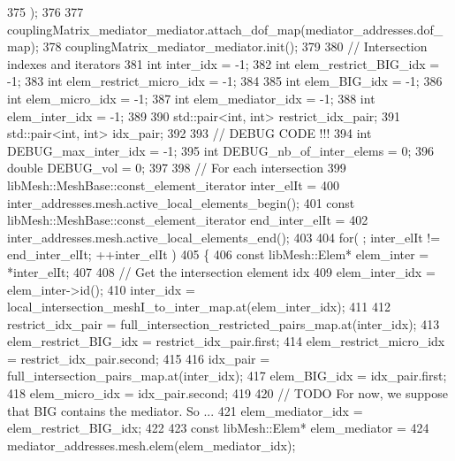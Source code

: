 \begin{DoxyCode}
375                 );
376         
377         couplingMatrix\_mediator\_mediator.attach\_dof\_map(mediator\_addresses.dof\_map);
378         couplingMatrix\_mediator\_mediator.init();
379 
380         \textcolor{comment}{// Intersection indexes and iterators}
381         \textcolor{keywordtype}{int} inter\_idx = -1;
382         \textcolor{keywordtype}{int} elem\_restrict\_BIG\_idx = -1;
383         \textcolor{keywordtype}{int} elem\_restrict\_micro\_idx = -1;
384 
385         \textcolor{keywordtype}{int} elem\_BIG\_idx = -1;
386         \textcolor{keywordtype}{int} elem\_micro\_idx = -1;
387         \textcolor{keywordtype}{int} elem\_mediator\_idx = -1;
388         \textcolor{keywordtype}{int} elem\_inter\_idx = -1;
389 
390         std::pair<int, int> restrict\_idx\_pair;
391         std::pair<int, int> idx\_pair;
392 
393         \textcolor{comment}{// DEBUG CODE !!!}
394         \textcolor{keywordtype}{int} DEBUG\_max\_inter\_idx = -1;
395         \textcolor{keywordtype}{int} DEBUG\_nb\_of\_inter\_elems = 0;
396         \textcolor{keywordtype}{double} DEBUG\_vol = 0;
397 
398         \textcolor{comment}{// For each intersection}
399         libMesh::MeshBase::const\_element\_iterator           inter\_elIt =
400                 inter\_addresses.mesh.active\_local\_elements\_begin();
401         \textcolor{keyword}{const} libMesh::MeshBase::const\_element\_iterator     end\_inter\_elIt =
402                 inter\_addresses.mesh.active\_local\_elements\_end();
403 
404         \textcolor{keywordflow}{for}( ; inter\_elIt != end\_inter\_elIt; ++inter\_elIt )
405         \{
406             \textcolor{keyword}{const} libMesh::Elem* elem\_inter = *inter\_elIt;
407 
408             \textcolor{comment}{// Get the intersection element idx}
409             elem\_inter\_idx = elem\_inter->id();
410             inter\_idx = local\_intersection\_meshI\_to\_inter\_map.at(elem\_inter\_idx);
411 
412             restrict\_idx\_pair = full\_intersection\_restricted\_pairs\_map.at(inter\_idx);
413             elem\_restrict\_BIG\_idx = restrict\_idx\_pair.first;
414             elem\_restrict\_micro\_idx = restrict\_idx\_pair.second;
415 
416             idx\_pair = full\_intersection\_pairs\_map.at(inter\_idx);
417             elem\_BIG\_idx = idx\_pair.first;
418             elem\_micro\_idx = idx\_pair.second;
419 
420             \textcolor{comment}{// TODO For now, we suppose that BIG contains the mediator. So ...}
421             elem\_mediator\_idx = elem\_restrict\_BIG\_idx;
422 
423             \textcolor{keyword}{const} libMesh::Elem* elem\_mediator =
424                     mediator\_addresses.mesh.elem(elem\_mediator\_idx);

\end{DoxyCode}
